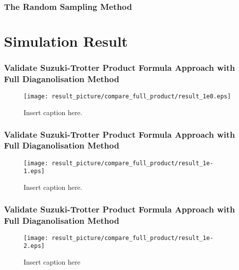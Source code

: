 \documentclass{beamer}
\begin{document}
\begin{frame}
	\frametitle{The Random Sampling Method}
\end{frame}



\section{Simulation Result}
\begin{frame}
		\frametitle{Validate Suzuki-Trotter Product Formula Approach with Full Diaganolisation Method}
		\begin{figure}[h]
			\centering
			\texttt{[image: result\_picture/compare\_full\_product/result\_1e0.eps]}
			\caption{Insert caption here.}
			
		\end{figure}
\end{frame}


\begin{frame}
	\frametitle{Validate Suzuki-Trotter Product Formula Approach with Full Diaganolisation Method}
	\begin{figure}[h]
		\centering
		\texttt{[image: result\_picture/compare\_full\_product/result\_1e-1.eps]}
		\caption{Insert caption here.}
		
	\end{figure}
\end{frame}


\begin{frame}
	\frametitle{Validate Suzuki-Trotter Product Formula Approach with Full Diaganolisation Method}
	\begin{figure}[h]
		\centering
		\texttt{[image: result\_picture/compare\_full\_product/result\_1e-2.eps]}
		\caption{Insert caption here}
		
	\end{figure}
\end{frame}
\end{document}
